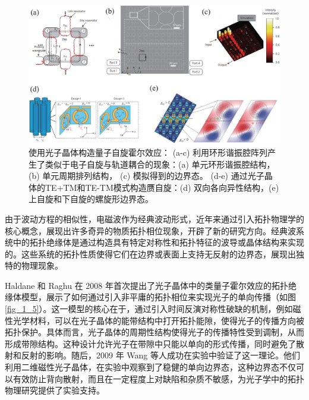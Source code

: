 \begin{figure}[h!]
    \centering
    \includegraphics[width=1\textwidth]{images/fig1-6.eps} 
    \caption{使用光子晶体构造量子自旋霍尔效应：
    (a-c) 利用环形谐振腔阵列产生了类似于电子自旋与轨道耦合的现象\cite{g2}：(a) 单元环形谐振腔结构， (b) 单元周期排列结构， (c) 模拟得到的边界态。
    (d-e) 通过光子晶体的TE+TM和TE-TM模式构造赝自旋\cite{g-add-1}：(d) 双向各向异性结构，(e) 上自旋和下自旋的螺旋形边界态。
    }
    \label{fig_1_6}
\end{figure}

由于波动方程的相似性，电磁波作为经典波动形式，近年来通过引入拓扑物理学的核心概念，展现出许多奇异的物质拓扑相位现象，开辟了新的研究方向。经典波系统中的拓扑绝缘体是通过构造具有特定对称性和拓扑特征的波导或晶体结构来实现的。这些系统的拓扑性质使得它们在边界或表面上支持无反射的边界态，展现出独特的物理现象。

Haldane 和 Raghu 在 2008 年首次提出了光子晶体中的类量子霍尔效应的拓扑绝缘体模型\cite{g1}，展示了如何通过引入非平庸的拓扑相位来实现光子的单向传播（如图\ref{fig_1_5}）。这一模型的核心在于，通过引入时间反演对称性破缺的机制，例如磁性光学材料，可以在光子晶体的能带结构中打开拓扑能隙，使得光子的传播方向被拓扑保护。具体而言，光子晶体的周期性结构使得光子的传播特性受到调制，从而形成带隙结构。这种设计允许光子在带隙中只能以单向的形式传播，同时避免了散射和反射的影响。随后，2009 年 Wang 等人成功在实验中验证了这一理论\cite{g2}。他们利用二维磁性光子晶体，在实验中观察到了稳健的单向边界态，这种边界态不仅可以有效防止背向散射，而且在一定程度上对缺陷和杂质不敏感，为光子学中的拓扑物理研究提供了实验支持。

